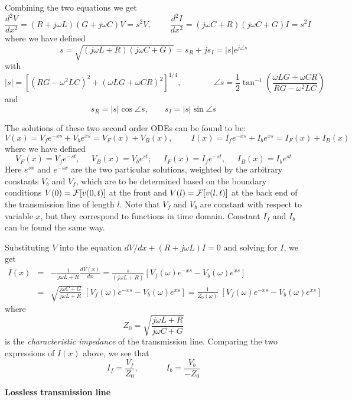 Combining the two equations we get
\[ \frac{d^2V}{dx^2}=(R+j\omega L)(G+j\omega C)V=s^2V,
\;\;\;\;\;\;\;\;
\frac{d^2I}{dx^2}=(j\omega C+R)(j\omega C+G)I=s^2I \]
where we have defined
\[ s=\sqrt{(j\omega L+R)(j\omega C+G)}=s_R+js_I=|s| e^{j\angle s} \]  
with 
\[ |s|=\left[ (RG-\omega^2LC)^2+(\omega LG+\omega CR)^2\right]^{1/4},
\;\;\;\;\;\;\;\;\;\;\;\;\;\;
\angle s=\frac{1}{2}\tan^{-1}\left(\frac{\omega LG+\omega CR}{RG-\omega^2LC}\right)\]
and
\[ s_R=|s|\cos\angle s,\;\;\;\;\;\;\;s_I=|s|\sin\angle s \]

The solutions of these two second order ODEs can be found to be:
\[ V(x)=V_f e^{-xs}+V_b e^{xs}=V_F(x)+V_B(x),
\;\;\;\;\;\;\;\; I(x)=I_f e^{-xs}+I_b e^{xs}=I_F(x)+I_B(x) \]
where we have defined
\[ V_F(x)=V_f e^{-st},\;\;\;\;\;V_B(x)=V_b e^{st};\;\;\;\;\;
I_F(x)=I_f e^{-st},\;\;\;\;\;I_B(x)=I_b e^{st} \]
Here $e^{sx}$ and $e^{-sx}$ are the two particular solutions, weighted by the 
arbitrary constants $V_b$ and $V_f$, which are to be determined based on the
boundary conditions $V(0)={\cal F}[v(0,t)]$ at the front and 
$V(l)={\cal F}[v(l,t)]$ at the back end of the transmission line of length $l$.
Note that $V_f$ and $V_b$ are constant with respect to variable $x$, but they 
correspond to functions in time domain. Constant $I_f$ and $I_b$ can be found 
the same way.

Substituting $V$ into the equation $dV/dx+(R+j\omega L)I=0$ and solving for $I$,
we get
\begin{eqnarray}
  I(x)&=&-\frac{1}{j\omega L+R}\frac{dV(x)}{dx}
  =\frac{s}{(j\omega L+R)}[V_f(\omega) e^{-xs}-V_b(\omega) e^{xs}]
  \nonumber \\
  &=&\sqrt{\frac{j\omega C+G}{j\omega L+R}}\;[V_f(\omega)e^{-xs}-V_b(\omega)e^{xs}]
  =\frac{1}{Z_0(\omega)}\;[V_f(\omega)e^{-xs}-V_b(\omega)e^{xs}]
  \nonumber 
\end{eqnarray}
where 
\[ Z_0=\sqrt{\frac{j\omega L+R}{j\omega C+G}} \]
is the {\em characteristic impedance} of the transmission line. Comparing the 
two expressions of $I(x)$ above, we see that
\[ I_f=\frac{V_f}{Z_0},\;\;\;\;\;\;\;\;\;\;\;\;I_b=\frac{V_b}{-Z_0} \]


{\bf Lossless transmission line}

